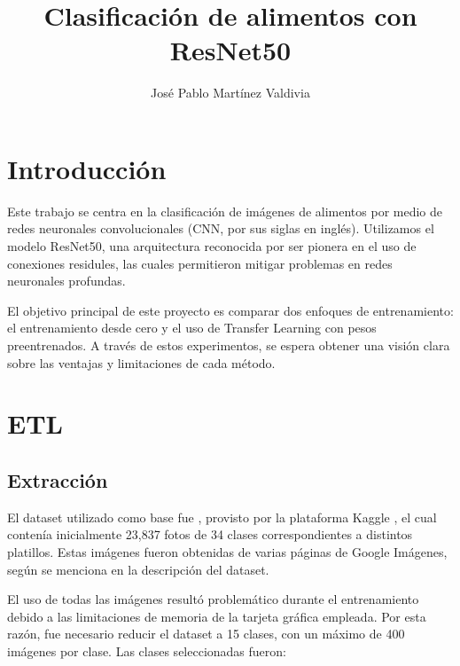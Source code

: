 \documentclass[twocolumn]{article}
\title{Clasificación de alimentos con ResNet50}
\author{José Pablo Martínez Valdivia}
\begin{document}

\section{Introducción}
Este trabajo se centra en la clasificación de imágenes de alimentos por medio de redes neuronales convolucionales (CNN, por sus siglas en inglés). Utilizamos el modelo ResNet50, una arquitectura reconocida por ser pionera en el uso de conexiones residules, las cuales permitieron mitigar problemas en redes neuronales profundas.

El objetivo principal de este proyecto es comparar dos enfoques de entrenamiento: el entrenamiento desde cero y el uso de Transfer Learning con pesos preentrenados. A través de estos experimentos, se espera obtener una visión clara sobre las ventajas y limitaciones de cada método.

\section{ETL} 
\subsection{Extracción} El dataset utilizado como base fue , provisto por la plataforma Kaggle \cite{datasetsrc}, el cual contenía inicialmente 23,837 fotos de 34 clases correspondientes a distintos platillos. Estas imágenes fueron obtenidas de varias páginas de Google Imágenes, según se menciona en la descripción del dataset.

El uso de todas las imágenes resultó problemático durante el entrenamiento debido a las limitaciones de memoria de la tarjeta gráfica empleada. Por esta razón, fue necesario reducir el dataset a 15 clases, con un máximo de 400 imágenes por clase. Las clases seleccionadas fueron:
\end{document}
